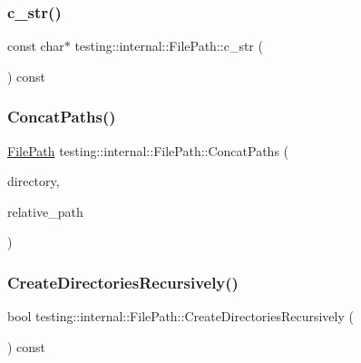 \subsubsection{\texorpdfstring{c\+\_\+str()}{c\_str()}}
{\footnotesize\ttfamily const char$\ast$ testing\+::internal\+::\+File\+Path\+::c\+\_\+str (\begin{DoxyParamCaption}{ }\end{DoxyParamCaption}) const\hspace{0.3cm}{\ttfamily [inline]}}

\mbox{\label{classtesting_1_1internal_1_1_file_path_ac9d57987f60ac43f0c57b89e333e531e}} 
\subsubsection{\texorpdfstring{Concat\+Paths()}{ConcatPaths()}}
{\footnotesize\ttfamily \hyperlink{classtesting_1_1internal_1_1_file_path}{File\+Path} testing\+::internal\+::\+File\+Path\+::\+Concat\+Paths (\begin{DoxyParamCaption}\item[{const \hyperlink{classtesting_1_1internal_1_1_file_path}{File\+Path} \&}]{directory,  }\item[{const \hyperlink{classtesting_1_1internal_1_1_file_path}{File\+Path} \&}]{relative\+\_\+path }\end{DoxyParamCaption})\hspace{0.3cm}{\ttfamily [static]}}

\mbox{\label{classtesting_1_1internal_1_1_file_path_a26790e530dd738f7fc8202c1ce718406}} 
\subsubsection{\texorpdfstring{Create\+Directories\+Recursively()}{CreateDirectoriesRecursively()}}
{\footnotesize\ttfamily bool testing\+::internal\+::\+File\+Path\+::\+Create\+Directories\+Recursively (\begin{DoxyParamCaption}{ }\end{DoxyParamCaption}) const}

